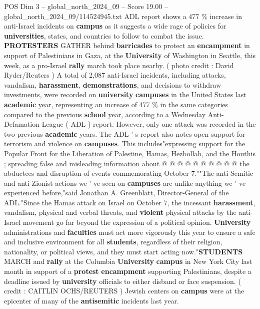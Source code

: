\begin{textsample}{POS Dim 3 – global\_north\_2024\_09 – Score 19.00 – global\_north\_2024\_09/114524945.txt}  \label{ex:f3_pos_164}
ADL report shows a 477 \% increase in anti-Israel incidents on \textbf{campus} as it suggests a wide rage of policies for \textbf{universities}, states, and countries to follow to combat the issue. \textbf{PROTESTERS} GATHER behind \textbf{barricades} to protect an \textbf{encampment} in support of Palestinians in Gaza, at the \textbf{University} of Washington in Seattle, this week, as a pro-Israel \textbf{rally} march took place nearby. ( photo credit : David Ryder/Reuters ) A total of 2,087 anti-Israel incidents, including attacks, vandalism, \textbf{harassment}, \textbf{demonstrations}, and decisions to withdraw investments, were recorded on \textbf{university} \textbf{campuses} in the United States last \textbf{academic} year, representing an increase of 477 \% in the same categories compared to the previous \textbf{school} year, according to a Wednesday Anti-Defamation League ( ADL ) report.
However, only one attack was recorded in the two previous \textbf{academic} years.
The ADL ' s report also notes open support for terrorism and violence on \textbf{campuses}.
This includes"expressing support for the Popular Front for the Liberation of Palestine, Hamas, Hezbollah, and the Houthis ; spreading false and misleading information about @ @ @ @ @ @ @ @ @ @ the abductees and disruption of events commemorating October 7.""The anti-Semitic and anti-Zionist actions we ' ve seen on \textbf{campuses} are unlike anything we ' ve experienced before,"said Jonathan A.
Greenblatt, Director-General of the ADL."Since the Hamas attack on Israel on October 7, the incessant \textbf{harassment}, vandalism, physical and verbal threats, and \textbf{violent} physical attacks by the anti-Israel movement go far beyond the expression of a political opinion. \textbf{University} administrations and \textbf{faculties} must act more vigorously this year to ensure a safe and inclusive environment for all \textbf{students}, regardless of their religion, nationality, or political views, and they must start acting now."\textbf{STUDENTS} MARCH and \textbf{rally} at the Columbia \textbf{University} \textbf{campus} in New York City last month in support of a \textbf{protest} \textbf{encampment} supporting Palestinians, despite a deadline issued by \textbf{university} officials to either disband or face suspension. ( credit : CAITLIN OCHS/REUTERS ) Jewish centers on \textbf{campus} were at the epicenter of many of the \textbf{antisemitic} incidents last year.

\end{textsample}
